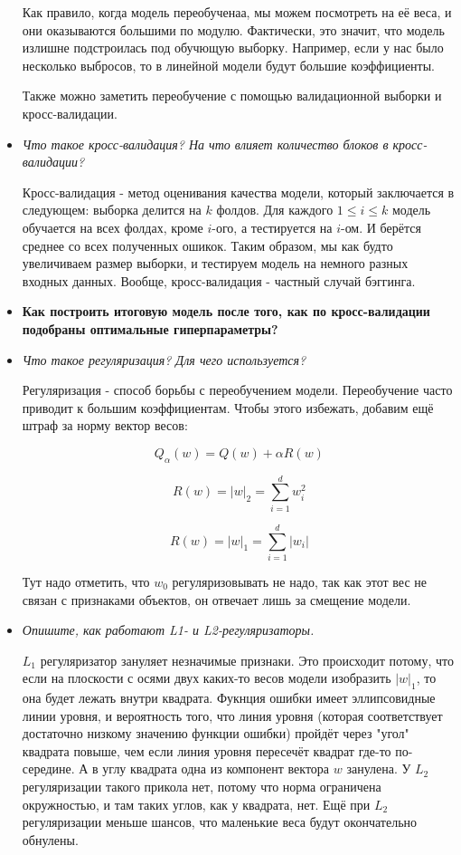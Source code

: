 \documentclass[12pt]{article}
\begin{document}
\begin{itemize}
Как правило, когда модель переобученаа, мы можем посмотреть на её веса, и они оказываются большими по модулю. Фактически, это значит, что модель излишне подстроилась под обучющую выборку. Например, если у нас было несколько выбросов, то в линейной модели будут большие коэффициенты.

Также можно заметить переобучение с помощью валидационной выборки и кросс-валидации.

\item \textit{Что такое кросс-валидация? На что влияет количество блоков в кросс-валидации?}

Кросс-валидация - метод оценивания качества модели, который заключается в следующем: выборка делится на $k$ фолдов. Для каждого $1\leq i \leq k$ модель обучается на всех фолдах, кроме $i$-ого, а тестируется на $i$-ом. И берётся среднее со всех полученных ошикок. Таким образом, мы как будто увеличиваем размер выборки, и тестируем модель на немного разных входных данных. Вообще, кросс-валидация - частный случай бэггинга.

\item \textbf{Как построить итоговую модель после того, как по кросс-валидации подобраны
оптимальные гиперпараметры?}

\item \textit{Что такое регуляризация? Для чего используется?}

Регуляризация - способ борьбы с переобучением модели. Переобучение часто приводит к большим коэффициентам. Чтобы этого избежать, добавим ещё штраф за норму вектор весов:

\[ Q_\alpha (w) = Q(w) + \alpha R(w)\]

\[ R(w) = |w|_2 = \sum_{i=1}^d w_i^2 \]

\[ R(w) = |w|_1 = \sum_{i=1}^d |w_i| \]

Тут надо отметить, что $w_0$ регуляризовывать не надо, так как этот вес не связан с признаками объектов, он отвечает лишь за смещение модели.

\item \textit{Опишите, как работают L1- и L2-регуляризаторы.}

$L_1$ регуляризатор зануляет незначимые признаки. Это происходит потому, что если на плоскости с осями двух каких-то весов модели изобразить $|w|_1$, то она будет лежать внутри квадрата. Фукнция ошибки имеет эллипсовидные линии уровня, и вероятность того, что линия уровня (которая соответствует достаточно низкому значению функции ошибки) пройдёт через "угол" квадрата повыше, чем если линия уровня пересечёт квадрат где-то по-середине. А в углу квадрата одна из компонент вектора $w$ занулена. У $L_2$ регуляризации такого прикола нет, потому что норма ограничена окружностью, и там таких углов, как у квадрата, нет.
Ещё при $L_2$ регуляризации меньше шансов, что маленькие веса будут окончательно обнулены.


\end{itemize}
\end{document}
